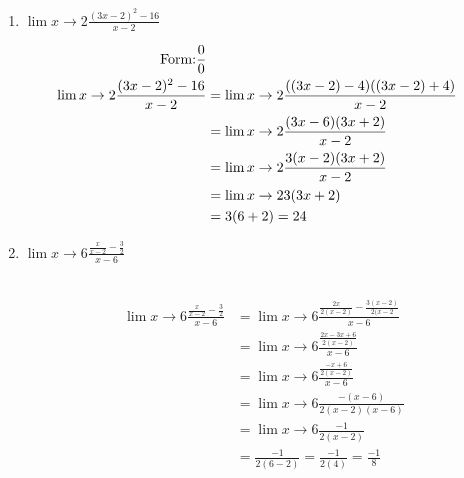 \documentclass{ximera}
\begin{document}
\begin{problem}
\begin{enumerate}
	
	\item  $ \displaystyle \lim{x \to 2} \frac{(3x-2)^2 - 16}{x-2}  $
\begin{explanation}
	\begin{align*}
	\text{Form:} \dfrac{0}{0}\\
	\displaystyle \lim{x \to 2} \frac{(3x-2)^2-16}{x-2} &=\displaystyle \lim{x \to 2} \frac{((3x-2)-4)((3x-2)+4)}{x-2} \\
	&= \displaystyle \lim{x \to 2} \frac{(3x-6)(3x+2)}{x-2} \\
	&= \displaystyle \lim{x \to 2} \frac{3(x-2)(3x+2)}{x-2} \\
	&= \displaystyle \lim{x \to 2} 3(3x+2)  \\
	&= 3(6+2) = 24   
	\end{align*}
	\end{explanation}
	

	\item $ \displaystyle \lim{x \to 6} \frac{\frac{x}{x-2} - \frac{3}{2}}{x-6}  $
\begin{explanation}
	 \hspace{0.5in} \ZeroOverZero\\ 
	 \begin{align*}
		\displaystyle \lim{x \to 6} \frac{\frac{x}{x-2} - \frac{3}{2}}{x-6} &= \displaystyle \lim{x \to 6} \frac{\frac{2x}{2(x-2)} - \frac{3(x-2)}{2(x-2}}{x-6}\\
		&=\displaystyle \lim{x \to 6} \frac{\frac{2x-3x+6}{2(x-2)} }{x-6} \\
		&=\displaystyle \lim{x \to 6} \frac{\frac{-x+6}{2(x-2)} }{x-6}\\
		&=\displaystyle \lim{x \to 6}\frac{-(x-6)}{2(x-2)(x-6)} \\
		&=\displaystyle \lim{x \to 6}\frac{-1}{2(x-2)} \\
		&=\frac{-1}{2(6-2)}= \frac{-1}{2(4)}=\frac{-1}{8}\\
			\end{align*}
	\end{explanation}
	

\end{enumerate}
\end{problem}
\end{document}
